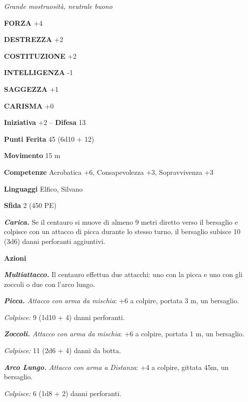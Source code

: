 \begin{multicols}{2}
\emph{Grande mostruosità, neutrale buono}

\textbf{FORZA} +4

\textbf{DESTREZZA} +2

\textbf{COSTITUZIONE} +2

\textbf{INTELLIGENZA} -1

\textbf{SAGGEZZA} +1

\textbf{CARISMA} +0

\textbf{Iniziativa} +2 -- \textbf{Difesa} 13

\textbf{Punti Ferita} 45 (6d10 + 12)

\textbf{Movimento} 15 m

\textbf{Competenze} Acrobatica +6, Consapevolezza +3, Sopravvivenza +3

\textbf{Linguaggi} Elfico, Silvano

\textbf{Sfida} 2 (450 PE)

\emph{\textbf{Carica.}} Se il centauro si muove di almeno 9 metri diretto verso il bersaglio e colpisce con un attacco di picca durante lo stesso turno, il bersaglio subisce 10 (3d6) danni perforanti aggiuntivi.

\textbf{Azioni}

\emph{\textbf{Multiattacco.}} Il centauro effettua due attacchi: uno con
la picca e uno con gli zoccoli o due con l'arco lungo.

\emph{\textbf{Picca.} Attacco con arma da mischia}: +6 a colpire,
portata 3 m, un bersaglio.

\emph{Colpisce:} 9 (1d10 + 4) danni perforanti.

\emph{\textbf{Zoccoli.} Attacco con arma da mischia}: +6 a colpire,
portata 1 m, un bersaglio.

\emph{Colpisce:} 11 (2d6 + 4) danni da botta.

\emph{\textbf{Arco Lungo.} Attacco con arma a Distanza}: +4 a colpire, gittata 45m, un bersaglio.

\emph{Colpisce:} 6 (1d8 + 2) danni perforanti.


\end{multicols}
